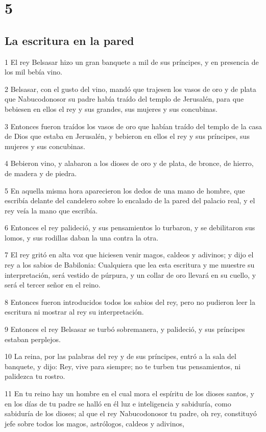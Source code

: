 \chapter{5}

\section*{La escritura en la pared}

\par 1 El rey Belsasar hizo un gran banquete a mil de sus príncipes, y en presencia de los mil bebía vino.
\par 2 Belsasar, con el gusto del vino, mandó que trajesen los vasos de oro y de plata que Nabucodonosor su padre había traído del templo de Jerusalén, para que bebiesen en ellos el rey y sus grandes, sus mujeres y sus concubinas.
\par 3 Entonces fueron traídos los vasos de oro que habían traído del templo de la casa de Dios que estaba en Jerusalén, y bebieron en ellos el rey y sus príncipes, sus mujeres y sus concubinas.
\par 4 Bebieron vino, y alabaron a los dioses de oro y de plata, de bronce, de hierro, de madera y de piedra.
\par 5 En aquella misma hora aparecieron los dedos de una mano de hombre, que escribía delante del candelero sobre lo encalado de la pared del palacio real, y el rey veía la mano que escribía.
\par 6 Entonces el rey palideció, y sus pensamientos lo turbaron, y se debilitaron sus lomos, y sus rodillas daban la una contra la otra.
\par 7 El rey gritó en alta voz que hiciesen venir magos, caldeos y adivinos; y dijo el rey a los sabios de Babilonia: Cualquiera que lea esta escritura y me muestre su interpretación, será vestido de púrpura, y un collar de oro llevará en su cuello, y será el tercer señor en el reino.
\par 8 Entonces fueron introducidos todos los sabios del rey, pero no pudieron leer la escritura ni mostrar al rey su interpretación. 
\par 9 Entonces el rey Belsasar se turbó sobremanera, y palideció, y sus príncipes estaban perplejos.
\par 10 La reina, por las palabras del rey y de sus príncipes, entró a la sala del banquete, y dijo: Rey, vive para siempre; no te turben tus pensamientos, ni palidezca tu rostro. 
\par 11 En tu reino hay un hombre en el cual mora el espíritu de los dioses santos, y en los días de tu padre se halló en él luz e inteligencia y sabiduría, como sabiduría de los dioses; al que el rey Nabucodonosor tu padre, oh rey, constituyó jefe sobre todos los magos, astrólogos, caldeos y adivinos,
